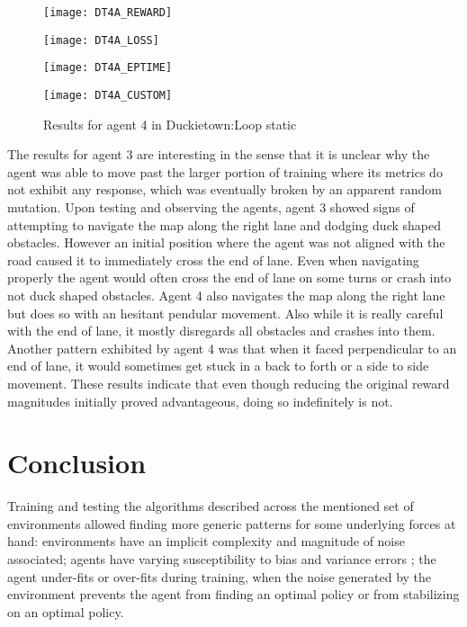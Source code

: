 \documentclass[journal]{IEEEtran}
\begin{document}
		\begin{figure}[hbt!]
			\centering
			
			\begin{minipage}[b]{4cm}
  				\texttt{[image: DT4A\_REWARD]}
 			\end{minipage}
			\quad
			\begin{minipage}[b]{4cm}
  				\texttt{[image: DT4A\_LOSS]}
			\end{minipage}
			\quad
			\begin{minipage}[b]{4cm}
  				\texttt{[image: DT4A\_EPTIME]}
 			\end{minipage}
			\quad
			\begin{minipage}[b]{4cm}
  				\texttt{[image: DT4A\_CUSTOM]}
			\end{minipage}
			
			\caption{Results for agent 4 in Duckietown:Loop static}
  			\label{fig:agentDT4}
		\end{figure}
		
		The results for agent 3 are interesting in the sense that it is unclear why the agent was able to move past the larger portion of training where its metrics do not exhibit any response, which was eventually broken by an apparent random mutation. Upon testing and observing the agents, agent 3 showed signs of attempting to navigate the map along the right lane and dodging duck shaped obstacles. However an initial position where the agent was not aligned with the road caused it to immediately cross the end of lane. Even when navigating properly the agent would often cross the end of lane on some turns or crash into not duck shaped obstacles. Agent 4 also navigates the map along the right lane but does so with an hesitant pendular movement. Also while it is really careful with the end of lane, it mostly disregards all obstacles and crashes into them. Another pattern exhibited by agent 4 was that when it faced perpendicular to an end of lane, it would sometimes get stuck in a back to forth or a side to side movement. These results indicate that even though reducing the original reward magnitudes initially proved advantageous, doing so indefinitely is not.

\section{Conclusion}
\label{section:Conclusions}

	Training and testing the algorithms described across the mentioned set of environments allowed finding more generic patterns for some underlying forces at hand: environments have an implicit complexity and magnitude of noise associated; agents have varying susceptibility to bias and variance errors \cite{neal2018modern}; the agent under-fits or over-fits during training, when the noise generated by the environment prevents the agent from finding an optimal policy or from stabilizing on an optimal policy.
	
\end{document}
